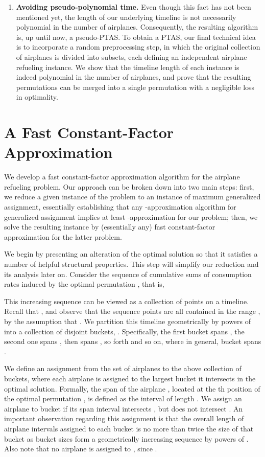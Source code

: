 \documentclass[11pt]{article}
\theoremstyle{plain}
\theoremstyle{definition}
\begin{document}
\begin{enumerate}
\item {\bf Avoiding pseudo-polynomial time.} Even though this fact has not been mentioned yet, the length of our underlying timeline is not necessarily polynomial in the number of airplanes. Consequently, the resulting  algorithm is, up until now, a pseudo-PTAS. To obtain a PTAS, our final technical idea is to incorporate a random preprocessing step, in which the original collection of airplanes is divided into subsets, each defining an independent airplane refueling instance. We show that the timeline length of each instance is indeed polynomial in the number of airplanes, and prove that the resulting permutations can be merged into a single permutation with a negligible loss in optimality.
\end{enumerate}



\section{A Fast Constant-Factor Approximation} \label{sec:constant}
We develop a fast constant-factor approximation algorithm for the airplane refueling problem. Our approach can be broken down into two main steps: first, we reduce a given instance of the problem to an instance of maximum generalized assignment, essentially establishing that any -approximation algorithm for generalized assignment implies at least -approximation for our problem; then, we solve the resulting instance by (essentially any) fast constant-factor approximation for the latter problem.

\smallskip {} We begin by presenting an alteration of the optimal solution so that it satisfies a number of helpful structural properties. This step will simplify our reduction and its analysis later on. Consider the sequence of cumulative sums of consumption rates induced by the optimal permutation , that is,

This increasing sequence can be viewed as a collection of points on a timeline. Recall that , and observe that the sequence points are all contained in the range , by the assumption that . We partition this timeline geometrically by powers of  into a collection of  disjoint buckets, . Specifically, the first bucket  spans , the second one  spans , then  spans , so forth and so on, where in general, bucket  spans .

We define an assignment from the set of airplanes to the above collection of buckets, where each airplane is assigned to the largest bucket it intersects in the optimal solution. Formally, the span of the airplane , located at the th position of the optimal permutation , is defined as the interval  of length . We assign an airplane to bucket  if its span interval intersects , but does not intersect . An important observation regarding this assignment is that the overall length of airplane intervals assigned to each bucket is no more than twice the size of that bucket as bucket sizes form a geometrically increasing sequence by powers of . Also note that no airplane is assigned to , since .
\end{document}
